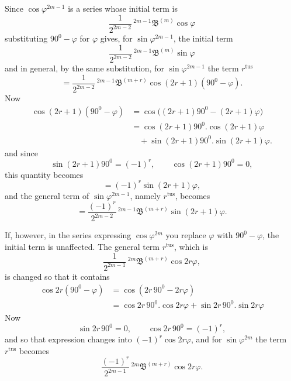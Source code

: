 \par\noindent{}%
\hspace*{\parindent}Since $\cos\varphi^{2m-1}$ is a series whose initial term is
\[
\frac{1}{2^{2m-2}}\,{}^{2m-1}\mathfrak{B}^{(m)}\cos\varphi
\]
substituting $90^0-\varphi$ for $\varphi$ gives, for $\sin\varphi^{2m-1}$, the initial term
\[
\frac{1}{2^{2m-2}}\,{}^{2m-1}\mathfrak{B}^{(m)}\sin\varphi
\]
and in general, by the same substitution, for $\sin\varphi^{2m-1}$ the term $r^{\text{tus}}$
\[
= \frac{1}{2^{2m-2}}\,{}^{2m-1}\mathfrak{B}^{(m+r)}\cos(2r+1)(90^0-\varphi).
\]
Now
\[
\begin{aligned}
\cos(2r+1)(90^0-\varphi) &= \cos\big((2r+1)90^0 - (2r+1)\varphi\big)\\
&= \cos(2r+1)90^0 . \cos(2r+1)\varphi\\&\quad + \sin(2r+1)90^0 . \sin(2r+1)\varphi.
\end{aligned}
\]
and since
\[
\sin(2r+1)90^0 = (-1)^r, \qquad \cos(2r+1)90^0 = 0,
\]
this quantity becomes
\[
= (-1)^r\sin(2r+1)\varphi,
\]
and the general term of $\sin\varphi^{2m-1}$, namely $r^{\text{tus}}$, becomes
\[
= \frac{(-1)^r}{2^{2m-2}}\,{}^{2m-1}\mathfrak{B}^{(m+r)}\sin(2r+1)\varphi.
\]

If, however, in the series expressing $\cos\varphi^{2m}$ you replace $\varphi$ with $90^0-\varphi$, the initial term is unaffected. The general term $r^{\text{tus}}$, which is
\[
\frac{1}{2^{2m-1}}\,{}^{2m}\mathfrak{B}^{(m+r)}\cos 2r\varphi,
\]
is changed so that it contains
\[
\begin{aligned}
\cos 2r(90^0-\varphi) &= \cos(2r\,90^0 - 2r\varphi)\\
&= \cos 2r\,90^0 . \cos 2r\varphi + \sin 2r\,90^0 . \sin 2r\varphi
\end{aligned}
\]
Now
\[
\sin 2r\,90^0 = 0, \qquad \cos 2r\,90^0 = (-1)^r,
\]
and so that expression changes into $(-1)^r\cos 2r\varphi$, and for $\sin\varphi^{2m}$ the term $r^{\text{tus}}$ becomes
\[
\frac{(-1)^r}{2^{2m-1}}\,{}^{2m}\mathfrak{B}^{(m+r)}\cos 2r\varphi.
\]
